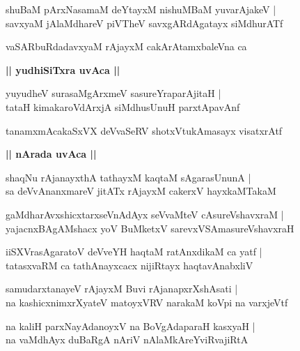 \documentclass[twoside,12pt,openright]{book}
\newcounter{shloka}[chapter]
\def\uvaca#1{\centerline{{\large\textbf{#1}}}}
\begin{document}
\begin{shloka}%
shuBaM pArxNasamaM deYtayxM nishuMBaM yuvarAjakeV |\\
savxyaM jAlaMdhareV piVTheV savxgARdAgatayx siMdhurATf
\end{shloka}

\begin{shloka}%
vaSARbuRdadavxyaM rAjayxM cakArAtamxbaleVna ca 
\end{shloka}

\uvaca{|| yudhiSiTxra uvAca ||}

\begin{shloka}%
yuyudheV surasaMgArxmeV sasureYraparAjitaH |\\
tataH kimakaroVdArxjA siMdhusUnuH parxtApavAnf 
\end{shloka}

\begin{shloka}%
tanamxmAcakaSxVX deVvaSeRV shotxVtukAmasayx visatxrAtf
\end{shloka}

\uvaca{|| nArada uvAca ||}

\begin{shloka}%
shaqNu rAjanayxthA tathayxM kaqtaM sAgarasUnunA |\\
sa deVvAnanxmareV jitATx rAjayxM cakerxV hayxkaMTakaM 
\end{shloka}

\begin{shloka}%
gaMdharAvxshicxtarxseVnAdAyx seVvaMteV cAsureVshavxraM |\\
yajacnxBAgAMshacx yoV BuMketxV sarevxVSAmasureVshavxraH
\end{shloka}

\begin{shloka}%
iiSXVrasAgaratoV deVveYH haqtaM ratAnxdikaM ca yatf |\\
tatasxvaRM ca tathAnayxcacx nijiRtayx haqtavAnabxliV 
\end{shloka}

\begin{shloka}%
samudarxtanayeV rAjayxM Buvi rAjanapxrXshAsati |\\ 
na kashicxnimxrXyateV matoyxVRV narakaM koVpi na varxjeVtf
\end{shloka}

\begin{shloka}%
na kaliH parxNayAdanoyxV na BoVgAdaparaH kasxyaH |\\
na vaMdhAyx duBaRgA nAriV nAlaMkAreYviRvajiRtA 
\end{shloka}
\end{document}
